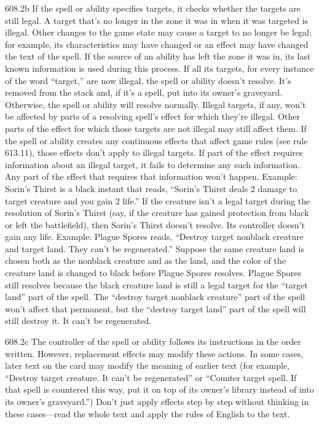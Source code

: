608.2b If the spell or ability specifies targets, it checks whether the targets are still legal. A target that’s no longer in the zone it was in when it was targeted is illegal. Other changes to the game state may cause a target to no longer be legal; for example, its characteristics may have changed or an effect may have changed the text of the spell. If the source of an ability has left the zone it was in, its last known information is used during this process. If all its targets, for every instance of the word “target,” are now illegal, the spell or ability doesn’t resolve. It’s removed from the stack and, if it’s a spell, put into its owner’s graveyard. Otherwise, the spell or ability will resolve normally. Illegal targets, if any, won’t be affected by parts of a resolving spell’s effect for which they’re illegal. Other parts of the effect for which those targets are not illegal may still affect them. If the spell or ability creates any continuous effects that affect game rules (see rule 613.11), those effects don’t apply to illegal targets. If part of the effect requires information about an illegal target, it fails to determine any such information. Any part of the effect that requires that information won’t happen.
Example: Sorin’s Thirst is a black instant that reads, “Sorin’s Thirst deals 2 damage to target creature and you gain 2 life.” If the creature isn’t a legal target during the resolution of Sorin’s Thirst (say, if the creature has gained protection from black or left the battlefield), then Sorin’s Thirst doesn’t resolve. Its controller doesn’t gain any life.
Example: Plague Spores reads, “Destroy target nonblack creature and target land. They can’t be regenerated.” Suppose the same creature land is chosen both as the nonblack creature and as the land, and the color of the creature land is changed to black before Plague Spores resolves. Plague Spores still resolves because the black creature land is still a legal target for the “target land” part of the spell. The “destroy target nonblack creature” part of the spell won’t affect that permanent, but the “destroy target land” part of the spell will still destroy it. It can’t be regenerated.

608.2c The controller of the spell or ability follows its instructions in the order written. However, replacement effects may modify these actions. In some cases, later text on the card may modify the meaning of earlier text (for example, “Destroy target creature. It can’t be regenerated” or “Counter target spell. If that spell is countered this way, put it on top of its owner’s library instead of into its owner’s graveyard.”) Don’t just apply effects step by step without thinking in these cases—read the whole text and apply the rules of English to the text.

